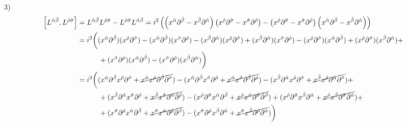 \documentclass[]{article}
\numberwithin{equation}{section}
\begin{document}
3)
\begin{align}
    \left[L^{\hat{\alpha}\hat{\beta}},L^{\hat{\rho}\hat{\sigma}}\right]&=L^{\hat{\alpha}\hat{\beta}}L^{\hat{\rho}\hat{\sigma}}-L^{\hat{\rho}\hat{\sigma}}L^{\hat{\alpha}\hat{\beta}}=i^2\left(\left(x^{\hat{\alpha}}\partial^{\hat{\beta}}-x^{\hat{\beta}}\partial^{\hat{\alpha}}\right)\left(x^{\hat{\rho}}\partial^{\hat{\sigma}}-x^{\hat{\sigma}}\partial^{\hat{\rho}}\right)-\left(x^{\hat{\rho}}\partial^{\hat{\sigma}}-x^{\hat{\sigma}}\partial^{\hat{\rho}}\right)\left(x^{\hat{\alpha}}\partial^{\hat{\beta}}-x^{\hat{\beta}}\partial^{\hat{\alpha}}\right)\right)\\
    &=i^2\bigg((x^{\hat{\alpha}}\partial^{\hat{\beta}})(x^{\hat{\rho}}\partial^{\hat{\sigma}})-(x^{\hat{\alpha}}\partial^{\hat{\beta}})(x^{\hat{\sigma}}\partial^{\hat{\rho}})-(x^{\hat{\beta}}\partial^{\hat{\alpha}})(x^{\hat{\rho}}\partial^{\hat{\sigma}})+(x^{\hat{\beta}}\partial^{\hat{\alpha}})(x^{\hat{\sigma}}\partial^{\hat{\rho}})-(x^{\hat{\rho}}\partial^{\hat{\sigma}})(x^{\hat{\alpha}}\partial^{\hat{\beta}})+(x^{\hat{\rho}}\partial^{\hat{\sigma}})(x^{\hat{\beta}}\partial^{\hat{\alpha}})+\nonumber\\
    &~~~~~~~~~+(x^{\hat{\sigma}}\partial^{\hat{\rho}})(x^{\hat{\alpha}}\partial^{\hat{\beta}})-(x^{\hat{\sigma}}\partial^{\hat{\rho}})(x^{\hat{\beta}}\partial^{\hat{\alpha}})\bigg)\nonumber\\
    &=i^2\bigg((x^{\hat{\alpha}}\partial^{\hat{\beta}}x^{\hat{\rho}}\partial^{\hat{\sigma}}+\cancel{x^{\hat{\alpha}}x^{\hat{\rho}}\partial^{\hat{\beta}}\partial^{\hat{\sigma}}})-(x^{\hat{\alpha}}\partial^{\hat{\beta}}x^{\hat{\sigma}}\partial^{\hat{\rho}}+\cancel{x^{\hat{\alpha}}x^{\hat{\sigma}}\partial^{\hat{\beta}}\partial^{\hat{\rho}}})-(x^{\hat{\beta}}\partial^{\hat{\alpha}}x^{\hat{\rho}}\partial^{\hat{\sigma}}+\cancel{x^{\hat{\beta}}x^{\hat{\rho}}\partial^{\hat{\alpha}}\partial^{\hat{\sigma}}})+\nonumber\\
    &~~~~~~~~~+(x^{\hat{\beta}}\partial^{\hat{\alpha}}x^{\hat{\sigma}}\partial^{\hat{\rho}}+\cancel{x^{\hat{\beta}}x^{\hat{\sigma}}\partial^{\hat{\alpha}}\partial^{\hat{\rho}}})-(x^{\hat{\rho}}\partial^{\hat{\sigma}}x^{\hat{\alpha}}\partial^{\hat{\beta}}+\cancel{x^{\hat{\rho}}x^{\hat{\alpha}}\partial^{\hat{\sigma}}\partial^{\hat{\beta}}})+(x^{\hat{\rho}}\partial^{\hat{\sigma}}x^{\hat{\beta}}\partial^{\hat{\alpha}}+\cancel{x^{\hat{\rho}}x^{\hat{\beta}}\partial^{\hat{\sigma}}\partial^{\hat{\alpha}}})+\nonumber\\
    &~~~~~~~~~+(x^{\hat{\sigma}}\partial^{\hat{\rho}}x^{\hat{\alpha}}\partial^{\hat{\beta}}+\cancel{x^{\hat{\sigma}}x^{\hat{\alpha}}\partial^{\hat{\rho}}\partial^{\hat{\beta}}})-(x^{\hat{\sigma}}\partial^{\hat{\rho}}x^{\hat{\beta}}\partial^{\hat{\alpha}}+\cancel{x^{\hat{\sigma}}x^{\hat{\beta}}\partial^{\hat{\rho}}\partial^{\hat{\alpha}}})\bigg)\nonumber\\

\end{align}
\end{document}
